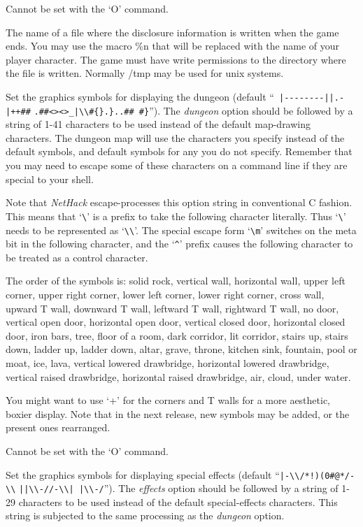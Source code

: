 Cannot be set with the `O' command.
\item[\tb{dumpfile}]
The name of a file where the disclosure information is written when the
game ends. You may use the macro \%n that will be replaced with the name
of your player character. The game must have write permissions to the
directory where the file is written. Normally /tmp may be used for unix
systems.
\item[\tb{dungeon}]
Set the graphics symbols for displaying the dungeon
(default
``\verb& |--------||.-|++##& \verb&.##<><>_|\\#{}.}..## #}&'').
The
{\it dungeon }
option should be followed by a string of 1-41
characters to be used instead of the default map-drawing characters.
The dungeon map will use the characters you specify instead of the
default symbols, and default symbols for any you do not specify.
Remember that you may need to escape some of these characters
on a command line if they are special to your shell.

Note that {\it NetHack\/} escape-processes this option string in conventional C
fashion.  This means that `\verb+\+' is a prefix to take the following
character literally.  Thus `\verb+\+' needs to be represented as `\verb+\\+'.
The special escape form
`\verb+\m+' switches on the meta bit in the following character, and the
`{\tt \^{}}' prefix causes the following character to be treated as a control
character.

The order of the symbols is:  solid rock, vertical wall, horizontal
wall, upper left corner, upper right corner, lower left corner, lower
right corner, cross wall, upward T wall, downward T wall, leftward T
wall, rightward T wall, no door, vertical open door, horizontal open
door, vertical closed door, horizontal closed door, iron bars, tree,
floor of a room, dark corridor, lit corridor, stairs up, stairs down,
ladder up, ladder down, altar, grave, throne, kitchen sink, fountain, pool or moat,
ice, lava, vertical lowered drawbridge, horizontal lowered drawbridge,
vertical raised drawbridge, horizontal raised drawbridge, air, cloud,
under water.

You might want to use `+' for the corners and T walls for a more
aesthetic, boxier display.  Note that in the next release, new symbols
may be added, or the present ones rearranged.

Cannot be set with the `O' command.
\item[\tb{effects}]
Set the graphics symbols for displaying special effects
(default ``\verb&|-\\/*!)(0#@*/-\\& \verb&||\\-//-\\| |\\-/&'').
The
{\it effects }
option should be followed by a string of 1-29
characters to be used instead of the default special-effects characters.
This string is subjected to the same processing as the
{\it dungeon }
option.

